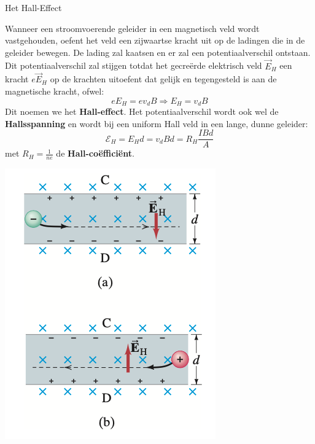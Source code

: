 \begin{theo}{Het Hall-Effect}
    \begin{minipage}{0.78\textwidth}
        Wanneer een stroomvoerende geleider in een magnetisch veld wordt vastgehouden,
        oefent het veld een zijwaartse kracht uit op de ladingen die in de geleider bewegen.
        De lading zal kaatsen en er zal een potentiaalverschil ontstaan. Dit potentiaalverschil zal
        stijgen totdat het gecreërde elektrisch veld $\Vec{E}_H$ een kracht $e\Vec{E}_H$
        op de krachten uitoefent dat gelijk en tegengesteld is aan de magnetische kracht, ofwel:
        \begin{equation*}
            eE_H = ev_{d}B \Rightarrow E_H = v_{d}B
        \end{equation*}
        Dit noemen we het \textbf{Hall-effect}. Het potentiaalverschil wordt ook wel de \textbf{Hallsspanning}
        en wordt bij een uniform Hall veld in een lange, dunne geleider:
        \begin{equation*}
            \mathcal{E}_H = E_{H}d = v_{d}Bd = R_H\dfrac{IBd}{A}
        \end{equation*}
        met $R_H = \tfrac{1}{ne}$ de \textbf{Hall-coëfficiënt}.
    \end{minipage}
    \begin{minipage}{.18\textwidth}
        \includegraphics[scale = 0.3]{Images/Magnetisme/HallEffect}
    \end{minipage}
    \vspace{0.2cm}

\end{theo}

